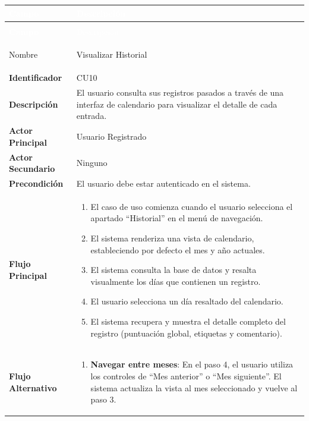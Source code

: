 \begingroup
\small 
\renewcommand{\arraystretch}{1.4}
\begin{xltabular}{\textwidth}{|>{\bfseries}p{3.5cm}|X|}
    \textcolor{white}{Campo} & \textcolor{white}{Descripción} \\ \hline
    \endfirsthead

     \\
    \hline
    \textcolor{white}{Campo} & \textcolor{white}{Descripción} \\ \hline
    \endhead

    Nombre & Visualizar Historial \\ \hline
    Identificador & CU10 \\ \hline
    Descripción & El usuario consulta sus registros pasados a través de una interfaz de calendario para visualizar el detalle de cada entrada. \\ \hline
    Actor Principal & Usuario Registrado \\ \hline
    Actor Secundario & Ninguno \\ \hline
    Precondición & El usuario debe estar autenticado en el sistema. \\ \hline
    Flujo Principal & 
    \begin{enumerate}[leftmargin=0.5cm, topsep=0pt, partopsep=0pt, parsep=0pt, itemsep=4pt]
        \item El caso de uso comienza cuando el usuario selecciona el apartado ``Historial'' en el menú de navegación.
        \item El sistema renderiza una vista de calendario, estableciendo por defecto el mes y año actuales.
        \item El sistema consulta la base de datos y resalta visualmente los días que contienen un registro.
        \item El usuario selecciona un día resaltado del calendario.
        \item El sistema recupera y muestra el detalle completo del registro (puntuación global, etiquetas y comentario).
    \end{enumerate} 
    \\ \hline
    Flujo Alternativo & 
    \begin{enumerate}[leftmargin=0.5cm, topsep=0pt, partopsep=0pt, parsep=0pt, itemsep=4pt]
        \item \textbf{Navegar entre meses}: En el paso 4, el usuario utiliza los controles de ``Mes anterior'' o ``Mes siguiente''. El sistema actualiza la vista al mes seleccionado y vuelve al paso 3.

\end{enumerate}
\end{xltabular}
